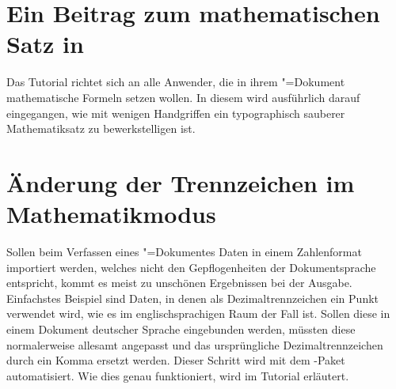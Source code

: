 \section{Ein Beitrag zum mathematischen Satz in }
\label{sec:exmpl:mathtype}
Das Tutorial  richtet sich an alle Anwender, die in ihrem 
"=Dokument mathematische Formeln setzen wollen. In diesem wird 
ausführlich darauf eingegangen, wie mit wenigen Handgriffen ein typographisch 
sauberer Mathematiksatz zu bewerkstelligen ist.

\section{Änderung der Trennzeichen im Mathematikmodus}
\label{sec:exmpl:mathswap}
Sollen beim Verfassen eines "=Dokumentes Daten in einem 
Zahlenformat importiert werden, welches nicht den Gepflogenheiten der 
Dokumentsprache entspricht, kommt es meist zu unschönen Ergebnissen bei der 
Ausgabe. Einfachstes Beispiel sind Daten, in denen als Dezimaltrennzeichen ein 
Punkt verwendet wird, wie es im englischsprachigen Raum der Fall ist. Sollen 
diese in einem Dokument deutscher Sprache eingebunden werden, müssten diese 
normalerweise allesamt angepasst und das ursprüngliche Dezimaltrennzeichen 
durch ein Komma ersetzt werden. Dieser Schritt wird mit dem \TUDScript-Paket 
 automatisiert. Wie dies genau funktioniert, wird im Tutorial 
 erläutert.
